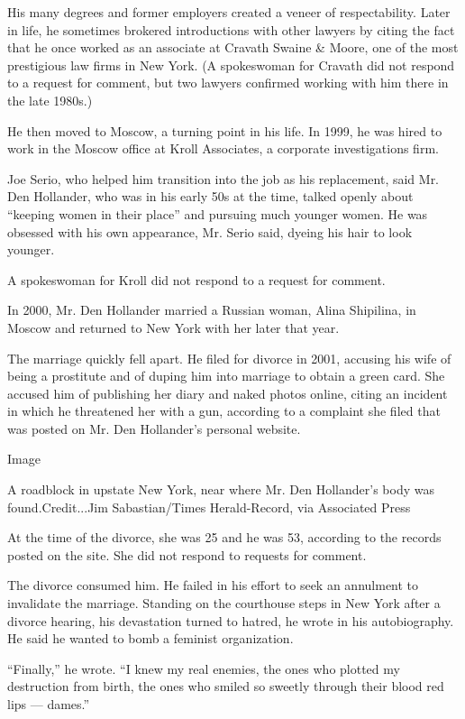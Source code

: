 His many degrees and former employers created a veneer of
respectability. Later in life, he sometimes brokered introductions with
other lawyers by citing the fact that he once worked as an associate at
Cravath Swaine \& Moore, one of the most prestigious law firms in New
York. (A spokeswoman for Cravath did not respond to a request for
comment, but two lawyers confirmed working with him there in the late
1980s.)

He then moved to Moscow, a turning point in his life. In 1999, he was
hired to work in the Moscow office at Kroll Associates, a corporate
investigations firm.

Joe Serio, who helped him transition into the job as his replacement,
said Mr. Den Hollander, who was in his early 50s at the time, talked
openly about ``keeping women in their place'' and pursuing much younger
women. He was obsessed with his own appearance, Mr. Serio said, dyeing
his hair to look younger.

A spokeswoman for Kroll did not respond to a request for comment.

In 2000, Mr. Den Hollander married a Russian woman, Alina Shipilina, in
Moscow and returned to New York with her later that year.

The marriage quickly fell apart. He filed for divorce in 2001, accusing
his wife of being a prostitute and of duping him into marriage to obtain
a green card. She accused him of publishing her diary and naked photos
online, citing an incident in which he threatened her with a gun,
according to a complaint she filed that was posted on Mr. Den
Hollander's personal website.

Image

A roadblock in upstate New York, near where Mr. Den Hollander's body was
found.Credit...Jim Sabastian/Times Herald-Record, via Associated Press

At the time of the divorce, she was 25 and he was 53, according to the
records posted on the site. She did not respond to requests for comment.

The divorce consumed him. He failed in his effort to seek an annulment
to invalidate the marriage. Standing on the courthouse steps in New York
after a divorce hearing, his devastation turned to hatred, he wrote in
his autobiography. He said he wanted to bomb a feminist organization.

``Finally,'' he wrote. ``I knew my real enemies, the ones who plotted my
destruction from birth, the ones who smiled so sweetly through their
blood red lips --- dames.''


